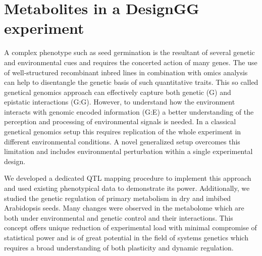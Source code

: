 \section{Metabolites in a DesignGG experiment}
A complex phenotype such as seed germination is the resultant of several genetic and environmental 
cues and requires the concerted action of many genes. The use of well-structured recombinant inbred 
lines in combination with omics analysis can help to disentangle the genetic basis of such 
quantitative traits. This so called genetical genomics approach can effectively capture both 
genetic (G) and epistatic interactions (G:G). However, to understand how the environment interacts 
with genomic encoded information (G:E) a better understanding of the perception and processing of 
environmental signals is needed. In a classical genetical genomics setup this requires replication 
of the whole experiment in different environmental conditions. A novel generalized setup overcomes 
this limitation and includes environmental perturbation within a single experimental design. 

We developed a dedicated QTL mapping procedure to implement this approach and used existing 
phenotypical data to demonstrate its power. Additionally, we studied the genetic regulation of 
primary metabolism in dry and imbibed Arabidopsis seeds. Many changes were observed in the 
metabolome which are both under environmental and genetic control and their interactions. 
This concept offers unique reduction of experimental load with minimal compromise of statistical 
power and is of great potential in the field of systems genetics which requires a broad 
understanding of both plasticity and dynamic regulation.

